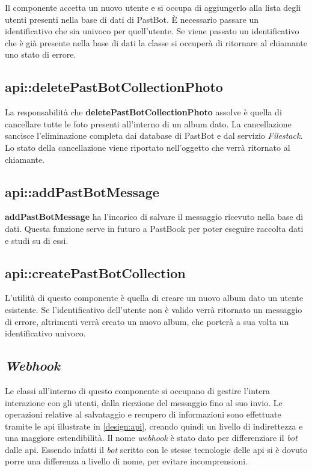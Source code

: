 Il componente accetta un nuovo utente e si occupa di aggiungerlo alla lista
degli utenti presenti nella base di dati di PastBot. È necessario passare un
identificativo che sia univoco per quell'utente. Se viene passato un
identificativo che è già presente nella base di dati la classe si occuperà di
ritornare al chiamante uno stato di errore.

\subsection{api::deletePastBotCollectionPhoto}

La responsabilità che \textbf{deletePastBotCollectionPhoto} assolve è quella di
cancellare tutte le foto presenti all'interno di un album dato. La
cancellazione sancisce l'eliminazione completa dai database di PastBot e dal
servizio \textit{Filestack}.
Lo stato della cancellazione viene riportato nell'oggetto che verrà ritornato
al chiamante.

\subsection{api::addPastBotMessage}

\textbf{addPastBotMessage} ha l'incarico di salvare il messaggio ricevuto nella
base di dati. Questa funzione serve in futuro a PastBook per poter eseguire
raccolta dati e studi su di essi.

\subsection{api::createPastBotCollection}

L'utilità di questo componente è quella di creare un nuovo album dato un
utente esistente. Se l'identificativo dell'utente non è valido verrà ritornato
un messaggio di errore, altrimenti verrà creato un nuovo album, che porterà a
sua volta un identificativo univoco.

\subsection{\textit{Webhook}}

Le classi all'interno di questo componente si occupano di gestire l'intera
interazione con gli utenti, dalla ricezione del messaggio fino al suo invio. Le
operazioni relative al salvataggio e recupero di informazioni sono effettuate
tramite le \gls{api} illustrate in \ref{design:api}, creando quindi un livello
di indirettezza e una maggiore estendibilità.
Il nome \textit{webhook} è stato dato per differenziare il \textit{bot} dalle
\gls{api}. Essendo infatti il \textit{bot} scritto con le stesse tecnologie
delle \gls{api} si è dovuto porre una differenza a livello di nome, per evitare
incomprensioni.

